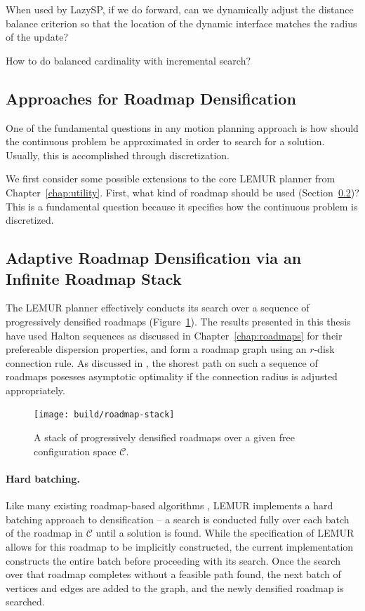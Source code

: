 When used by LazySP,
if we do forward,
can we dynamically adjust the distance balance criterion
so that the location of the dynamic interface
matches the radius of the update?

How to do balanced cardinality with incremental search?

\subsection{Approaches for Roadmap Densification}

One of the fundamental questions in any motion planning approach
is how should the continuous problem be approximated in order
to search for a solution.
Usually,
this is accomplished through discretization.

We first consider some possible extensions to the core
LEMUR planner from Chapter~\ref{chap:utility}.
First, what kind of roadmap should be used
(Section~\ref{sec:discussion:disc})?
This is a fundamental question because it specifies how the
continuous problem is discretized.

\subsection{Adaptive Roadmap Densification via an Infinite Roadmap Stack}
\label{sec:discussion:disc}
The LEMUR planner effectively conducts its search over a sequence of
progressively densified roadmaps
(Figure~\ref{fig:discussion:roadmap-stack}).
The results presented in this thesis have used Halton sequences
as discussed in Chapter~\ref{chap:roadmaps}
for their prefereable dispersion properties,
and form a roadmap graph using an $r$-disk connection rule.
As discussed in \citep{janson2015deterministicsampling},
the shorest path on such a sequence of roadmaps
posesses asymptotic optimality if the connection radius is adjusted
appropriately.

\begin{figure}
   \centering
   \texttt{[image: build/roadmap-stack]}
   \caption{A stack of progressively densified roadmaps
      over a given free configuration space $\mathcal{C}$.}
   \label{fig:discussion:roadmap-stack}
\end{figure}

\paragraph{Hard batching.}
Like many existing roadmap-based algorithms
\citep{starek2015bfmtstar, gammell2015bitstar},
LEMUR implements a hard batching approach to densification --
a search is conducted fully over each batch of the roadmap
in $\mathcal{C}$
until a solution is found.
While the specification of LEMUR allows for this roadmap to be
implicitly constructed,
the current implementation constructs the entire batch before
proceeding with its search.
Once the search over that roadmap completes without a feasible path found,
the next batch of vertices and edges are added to the graph,
and the newly densified roadmap is searched.

